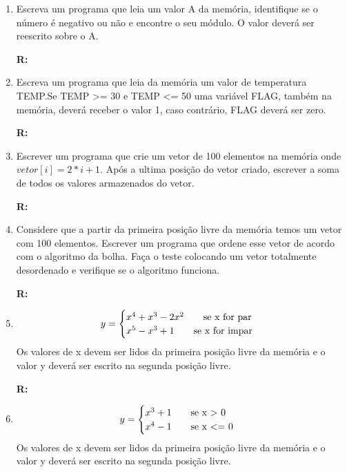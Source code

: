 \documentclass[a4paper,11pt,fleqn]{article}
\begin{document}
\begin{enumerate}
    \item{Escreva um programa que leia um valor A da memória, identifique se o número é negativo ou não e
            encontre o seu módulo. O valor deverá ser reescrito sobre o A.}

        \textbf{R:}
        
        \newpage

    \item{Escreva um programa que leia da memória um valor de temperatura TEMP.\@ Se TEMP >= 30 e TEMP <= 50
            uma variável FLAG, também na memória, deverá receber o valor 1, caso contrário, FLAG deverá
            ser zero.}

        \textbf{R:}
        
        \newpage

    \item{Escrever um programa que crie um vetor de 100 elementos na memória onde \\ $vetor[i] = 2*i + 1$.
            Após a ultima posição do vetor criado, escrever a soma de todos os valores armazenados do
            vetor.}

        \textbf{R:}
        
        \newpage

    \item{Considere que a partir da primeira posição livre da memória temos um vetor com 100 elementos.
            Escrever um programa que ordene esse vetor de acordo com o algoritmo da bolha. Faça o teste
            colocando um vetor totalmente desordenado e verifique se o algoritmo funciona.}

        \textbf{R:}
        
        \newpage
    \item{
            \[
                y =
                \begin{cases}
                    x^4 + x^3 - 2x^2 \text{\qquad se x for par} \\
                    x^5 - x^3 + 1 \text{\qquad se x for impar}
                \end{cases}
            \]
            Os valores de x devem ser lidos da primeira posição livre da memória e o valor y deverá ser
            escrito na segunda posição livre.
        }

        \textbf{R:}
        
        \newpage

    \item{
            \[
                y =
                \begin{cases}
                    x^3 + 1  \text{\qquad se x > 0} \\
                    x^4 - 1 \text{\qquad se x <= 0}
                \end{cases}
            \]
            Os valores de x devem ser lidos da primeira posição livre da memória e o valor y deverá ser
            escrito na segunda posição livre.
        }


\end{enumerate}
\end{document}
